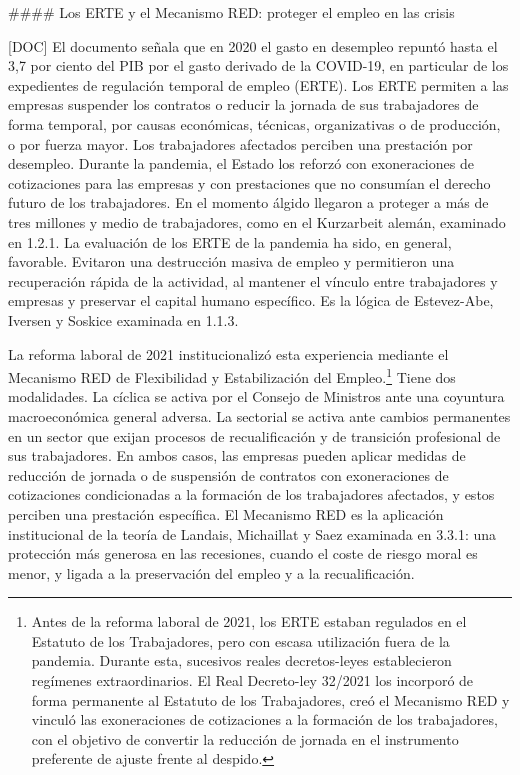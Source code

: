 \documentclass[10pt,a4paper]{article}
\begin{document}
#### Los ERTE y el Mecanismo RED: proteger el empleo en las crisis

[DOC] El documento señala que en 2020 el gasto en desempleo repuntó hasta el 3,7 por ciento del PIB por el gasto derivado de la COVID-19, en particular de los expedientes de regulación temporal de empleo (ERTE). Los ERTE permiten a las empresas suspender los contratos o reducir la jornada de sus trabajadores de forma temporal, por causas económicas, técnicas, organizativas o de producción, o por fuerza mayor. Los trabajadores afectados perciben una prestación por desempleo. Durante la pandemia, el Estado los reforzó con exoneraciones de cotizaciones para las empresas y con prestaciones que no consumían el derecho futuro de los trabajadores. En el momento álgido llegaron a proteger a más de tres millones y medio de trabajadores, como en el Kurzarbeit alemán, examinado en 1.2.1. La evaluación de los ERTE de la pandemia ha sido, en general, favorable. Evitaron una destrucción masiva de empleo y permitieron una recuperación rápida de la actividad, al mantener el vínculo entre trabajadores y empresas y preservar el capital humano específico. Es la lógica de Estevez-Abe, Iversen y Soskice examinada en 1.1.3.

La reforma laboral de 2021 institucionalizó esta experiencia mediante el Mecanismo RED de Flexibilidad y Estabilización del Empleo.\footnote{Antes de la reforma laboral de 2021, los ERTE estaban regulados en el Estatuto de los Trabajadores, pero con escasa utilización fuera de la pandemia. Durante esta, sucesivos reales decretos-leyes establecieron regímenes extraordinarios. El Real Decreto-ley 32/2021 los incorporó de forma permanente al Estatuto de los Trabajadores, creó el Mecanismo RED y vinculó las exoneraciones de cotizaciones a la formación de los trabajadores, con el objetivo de convertir la reducción de jornada en el instrumento preferente de ajuste frente al despido.
} Tiene dos modalidades. La cíclica se activa por el Consejo de Ministros ante una coyuntura macroeconómica general adversa. La sectorial se activa ante cambios permanentes en un sector que exijan procesos de recualificación y de transición profesional de sus trabajadores. En ambos casos, las empresas pueden aplicar medidas de reducción de jornada o de suspensión de contratos con exoneraciones de cotizaciones condicionadas a la formación de los trabajadores afectados, y estos perciben una prestación específica. El Mecanismo RED es la aplicación institucional de la teoría de Landais, Michaillat y Saez examinada en 3.3.1: una protección más generosa en las recesiones, cuando el coste de riesgo moral es menor, y ligada a la preservación del empleo y a la recualificación.
\end{document}
